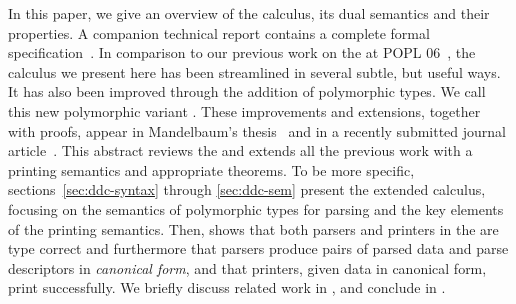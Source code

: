 


In this paper, we give an overview of the calculus, its dual semantics
and their properties.  A companion technical report contains a
complete formal specification~\cite{fisher+:popl-sub-long}.  In
comparison to our previous work on the \ddcold{} at POPL
06~\cite{fisher+:next700ddl}, the calculus we present here has been
streamlined in several subtle, but useful ways.  It has also been
improved through the addition of polymorphic types.  We call this new
polymorphic variant \ddc{}.  These improvements and extensions,
together with proofs, appear in Mandelbaum's
thesis~\cite{mandelbaum:thesis} and in a recently submitted journal
article~\cite{fisher+:ddcjournal}.  This abstract reviews the \ddc{}
and extends all the previous work with a printing semantics and
appropriate theorems.  To be more specific,
sections~\ref{sec:ddc-syntax} through \ref{sec:ddc-sem} present the
extended \ddc{} calculus, focusing on the semantics of polymorphic
types for parsing and the key elements of the printing semantics.
Then,  shows that both parsers and printers in
the \ddc{} are type correct and furthermore that parsers produce pairs
of parsed data and parse descriptors in {\em canonical form}, and that
printers, given data in canonical form, print successfully. We briefly
discuss related work in , and conclude in
.

